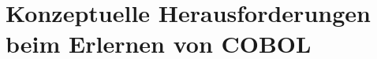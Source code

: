 \chapter{Konzeptuelle Herausforderungen beim Erlernen von COBOL}
\label{ch:chap1}
    
    
    
    